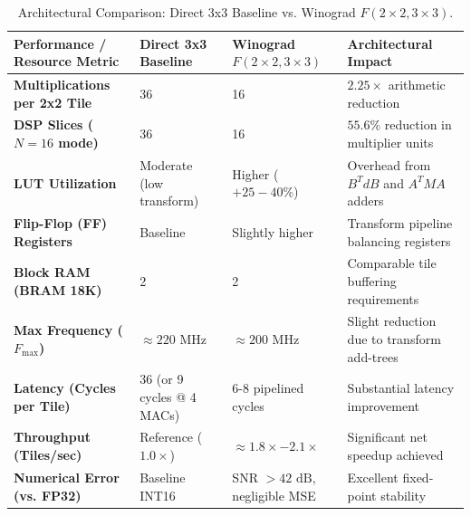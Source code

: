 \documentclass[12pt,a4paper]{article}
\begin{document}
\begin{table}[htbp]
    \centering
    \caption{Architectural Comparison: Direct 3x3 Baseline vs. Winograd $F(2 \times 2, 3 \times 3)$.}
    \label{tab:comparison_results}
    \small
    \begin{tabularx}{\textwidth}{lXXX}
        \toprule
        \textbf{Performance / Resource Metric} & \textbf{Direct 3x3 Baseline} & \textbf{Winograd $F(2 \times 2, 3 \times 3)$} & \textbf{Architectural Impact}                \\
        \midrule
        \textbf{Multiplications per 2x2 Tile}  & 36                           & 16                                            & $2.25\times$ arithmetic reduction            \\
        \textbf{DSP Slices ($N=16$ mode)}      & 36                           & 16                                            & $55.6\%$ reduction in multiplier units       \\
        \textbf{LUT Utilization}               & Moderate (low transform)     & Higher ($+25-40\%$)                           & Overhead from $B^T d B$ and $A^T M A$ adders \\
        \textbf{Flip-Flop (FF) Registers}      & Baseline                     & Slightly higher                               & Transform pipeline balancing registers       \\
        \textbf{Block RAM (BRAM 18K)}          & 2                            & 2                                             & Comparable tile buffering requirements       \\
        \textbf{Max Frequency ($F_{\max}$)}    & $\approx 220\text{ MHz}$     & $\approx 200\text{ MHz}$                      & Slight reduction due to transform add-trees  \\
        \textbf{Latency (Cycles per Tile)}     & 36 (or 9 cycles @ 4 MACs)    & 6-8 pipelined cycles                          & Substantial latency improvement              \\
        \textbf{Throughput (Tiles/sec)}        & Reference ($1.0\times$)      & $\approx 1.8\times - 2.1\times$               & Significant net speedup achieved             \\
        \textbf{Numerical Error (vs. FP32)}    & Baseline INT16               & SNR $> 42\text{ dB}$, negligible MSE          & Excellent fixed-point stability              \\
        \bottomrule
    \end{tabularx}
\end{table}
\end{document}
